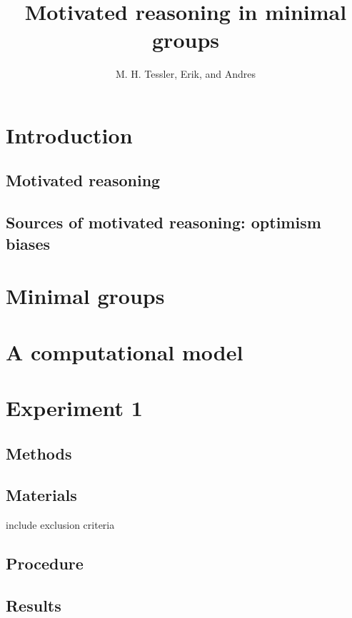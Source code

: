 \documentclass{article} \usepackage{apacite} \usepackage{graphicx} \usepackage{listings}
\begin{document}
 \title{Motivated reasoning in minimal groups}
\author{M. H. Tessler, Erik, and Andres} \renewcommand{\today}{Psych 241\\June 8,
2014} \maketitle

\section{Introduction}

\subsection{Motivated reasoning}

\subsection{Sources of motivated reasoning: optimism biases}

\section{Minimal groups}

\section{A computational model}

\section{Experiment 1}

\subsection{Methods}

\subsection{Materials}

include exclusion criteria

\subsection{Procedure}

\subsection{Results}
\end{document}
